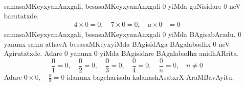 samasaMKeyxyanAnxgali, besasaMKeyxyanAnxgali $0$ yiMda guNisidare  $0$ neV barutatxde.
\begin{align*}
4\times 0 = 0,\quad 7\times 0 = 0,\quad a\times 0 &= 0
\end{align*}
samasaMKeyxyanAnxgali, besasaMKeyxyanAnxgali $0$ yiMda BAgisabAradu. $0$ yanunx sama athavA besasaMKeyxyiMda BAgisidAga BAgalabadhx $0$ neV Agirutatxde. Adare $0$ yanunx $0$ yiMda BAgisidare BAgalabadhx anidhARrita.
$$
\frac{0}{1} = 0, \quad \frac{0}{2}=0,\quad \frac{0}{3}=0, \quad \frac{0}{4}=0, \quad \frac{0}{n} = 0, \quad n\neq 0
$$
Adare $0\times 0,\quad \frac{0}{0}=0$ idanunx bageharisalu kalanashAsatxrX AraMBavAyitu.  
